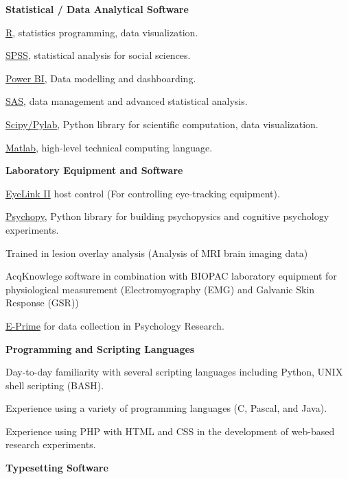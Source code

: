 \documentclass[10pt]{article}
\newenvironment{innerlist}[1][\enskip\textbullet]%
        {\begin{compactenum}[#1]}{\end{compactenum}}
\providecommand{\tightlist}{%
  \setlength{\itemsep}{0pt}\setlength{\parskip}{0pt}}
\begin{document}
\begin{outerlist}
\tightlist
\item
  \textbf{Statistical / Data Analytical Software}

 \begin{innerlist}
  \tightlist
  \item
    \href{http://www.r-project.org/}{R}, statistics programming, data
    visualization.
  \item
    \href{http://www.spss.com/}{SPSS}, statistical analysis for social
    sciences.
  \item
    \href{https://powerbi.microsoft.com/en-ca/}{Power BI}, Data
    modelling and dashboarding.
  \item
    \href{http://www.sas.com/}{SAS}, data management and advanced
    statistical analysis.
  \item
    \href{http://www.scipy.org/}{Scipy/Pylab}, Python library for
    scientific computation, data visualization.
  \item
    \href{https://www.mathworks.com/products/matlab/}{Matlab},
    high-level technical computing language.
 \end{innerlist}
\item
  \textbf{Laboratory Equipment and Software}

 \begin{innerlist}
  \tightlist
  \item
    \href{www.sr-research.com}{EyeLink II} host control (For controlling
    eye-tracking equipment).
  \item
    \href{http://www.psychopy.org/}{Psychopy}, Python library for
    building psychopysics and cognitive psychology experiments.
  \item
    Trained in lesion overlay analysis (Analysis of MRI brain imaging
    data)
  \item
    AcqKnowlege software in combination with BIOPAC laboratory equipment
    for physiological measurement (Electromyography (EMG) and Galvanic
    Skin Response (GSR))
  \item
    \href{http://www.pstnet.com/products/e-prime/}{E-Prime} for data
    collection in Psychology Research.
 \end{innerlist}
\item
  \textbf{Programming and Scripting Languages}

 \begin{innerlist}
  \tightlist
  \item
    Day-to-day familiarity with several scripting languages including
    Python, UNIX shell scripting (BASH).
  \item
    Experience using a variety of programming languages (C, Pascal, and
    Java).
  \item
    Experience using PHP with HTML and CSS in the development of
    web-based research experiments.
 \end{innerlist}
\item
  \textbf{Typesetting Software}


\end{outerlist}
\end{document}
